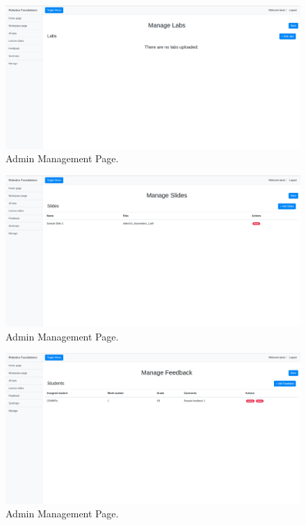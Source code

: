 \documentclass{l4proj}
\begin{document}
\begin{appendices}
\begin{figure}[h]
    \centering
    \includegraphics[scale=0.20]{images/admin_manage_lab.png}
    \caption{Admin Management Page.}
\end{figure}

\begin{figure}[h]
    \centering
    \includegraphics[scale=0.20]{images/manage_slide.png}
    \caption{Admin Management Page.}
\end{figure}

\begin{figure}[h]
    \centering
    \includegraphics[scale=0.20]{images/manage_feedback.png}
    \caption{Admin Management Page.}
\end{figure}


\end{appendices}
\end{document}
